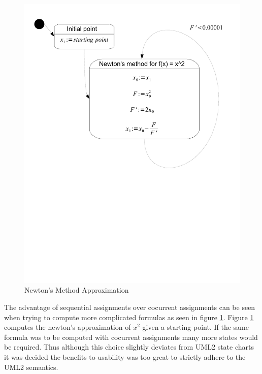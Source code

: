 \begin{figure}[htp]
    \centering
    \includegraphics[trim= 10mm 110mm 10mm 10mm, clip, width=\imgmedium]{./images/state_uml2_newtons.pdf}
    \caption{Newton's Method Approximation}
    \label{fig:state_uml2_newtons}
\end{figure}

The advantage of sequential assignments over cocurrent assignments can be seen when trying to compute more complicated formulas as seen in figure \ref{fig:state_uml2_newtons}. Figure \ref{fig:state_uml2_newtons} computes the newton's approximation of $x^2$ given a starting point. If the same formula was to be computed with cocurrent assignments many more states would be required. Thus although this choice slightly deviates from UML2 state charts it was decided the benefits to usability was too great to strictly adhere to the UML2 semantics.

